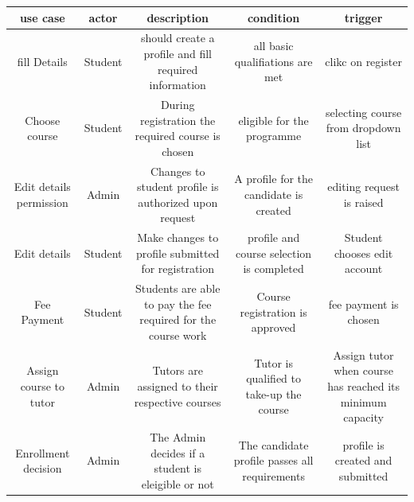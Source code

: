 \begin{table}[]
\begin{tabular}{@{}|c|c|c|c|c|@{}}
\toprule
use case                & actor   & description                                                   & condition                                     & trigger                                                   \\ \midrule
fill Details            & Student & should create a profile and fill required information         & all basic qualifiations are met               & clikc on register                                         \\ \midrule
Choose course           & Student & During registration the required course is chosen             & eligible for the programme                    & selecting course from dropdown list                       \\ \midrule
Edit details permission & Admin   & Changes to student profile is authorized upon request         & A profile for the candidate is created        & editing request is raised                                 \\ \midrule
Edit details            & Student & Make changes to profile submitted for registration            & profile and course selection is completed     & Student chooses edit account                              \\ \midrule
Fee Payment             & Student & Students are able to pay the fee required for the course work & Course registration is approved               & fee payment is chosen                                     \\ \midrule
Assign course to tutor  & Admin   & Tutors are assigned to their respective courses               & Tutor is qualified to take-up the course      & Assign tutor when course has reached its minimum capacity \\ \midrule
Enrollment decision     & Admin   & The Admin decides if a student is eleigible or not            & The candidate profile passes all requirements & profile is created and submitted                          \\ \bottomrule
\end{tabular}
\end{table}
